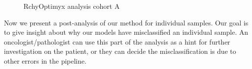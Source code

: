\begin{figure}[!ht]
  \caption{RchyOptimyx analysis cohort A}
  \label{fig:fcs-qa-rchy1}
\end{figure}

Now we present a post-analysis of our method for individual samples. Our goal is to give insight about why our models have misclassified an individual sample. An oncologist/pathologist can use this part of the analysis as a hint for further investigation on the patient, or they can decide the misclassification is due to other errors in the pipeline.

